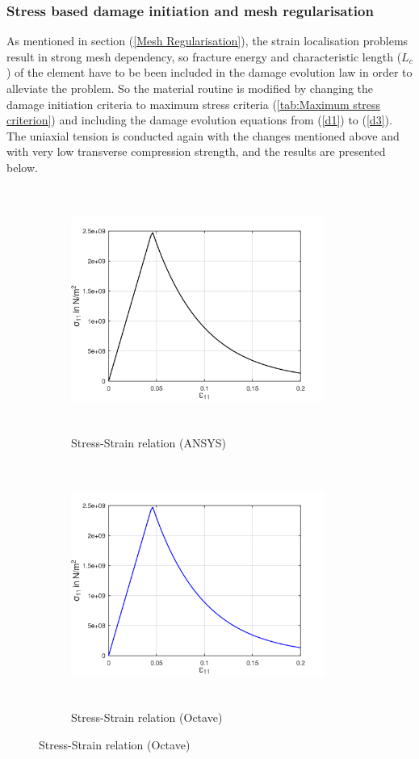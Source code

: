 \documentclass[12pt]{report}
\begin{document}
\subsubsection{Stress based damage initiation and mesh regularisation}
\indent\indent\indent As mentioned in section (\ref{Mesh Regularisation}), the strain localisation problems result in strong mesh dependency, so fracture energy and characteristic length ($L_{c}$) of the element have to be been included in the damage evolution law in order to alleviate the problem. So the material routine is modified by changing the damage initiation criteria to maximum stress criteria (\ref{tab:Maximum stress criterion}) and including the damage evolution equations from (\ref{d1}) to (\ref{d3}). The uniaxial tension is conducted again with the changes mentioned above and with very low transverse compression strength, and the results are presented below.
\begin{figure}[htbp!]
     \captionsetup[subfigure]{justification=centering}
     \begin{subfigure}{0.4\textwidth}
         \includegraphics[width=8.3cm,height=8cm,keepaspectratio]{22.StressvsStrain_Ansys.png}
         \caption{Stress-Strain relation (ANSYS)}
         \label{fig:Stress-Strain relation in Ansys2}
     \end{subfigure}
     \hspace{1.8cm}
     \begin{subfigure}{0.4\textwidth}
          \includegraphics[width=8.3cm,height=8cm,keepaspectratio]{22.StressvsStrain_Octave.png}
         \caption{Stress-Strain relation (Octave)}
         \label{fig:Stress-Strain relation Octave2}
     \end{subfigure}
\end{figure}
\end{document}
